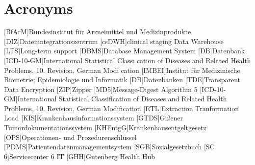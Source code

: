 \chapter*{Acronyms}
    \begin{acronym}[CDW]
    	[BfArM]{Bundesinstitut für Arzneimittel und Medizinprodukte}
    	[DIZ]{Datenintegrationszentrum}
    	[csDWH]{clinical staging Data Warehouse}
    	[LTS]{Long-term support}
    	[DBMS]{Database Management System}
    	[DB]{Datenbank}
    	[ICD-10-GM]{International Statistical Classication of Diseases and Related Health
    		Problems, 10. Revision, German Modication}
    	[IMBEI]{Institut für Medizinische Biometrie; Epidemiologie und Informatik}
    	[DB]{Datenbanken}
    	[TDE]{Transparent Data Encryption}
    	[ZIP]{Zipper}
    	[MD5]{Message-Digest Algorithm 5}
    	[ICD-10-GM]{International Statistical Classification of Diseases and Related Health Problems, 10. Revision, German Modification}
    	[ETL]{Extraction Tranformation Load}
    	[KIS]{Krankenhausinformationssystem}
    	[GTDS]{Gißener Tumordokumentationssystem}
    	[KHEntgG]{Krankenhausentgeltgesetz}
    	[OPS]{Operationen- und Prozedurenschlüssel}
    	[PDMS]{Patientendatenmanagementsystem}
    	[SGB]{Sozialgesetzbuch}
    	[SC 6]{Servicecenter 6 IT}
    	[GHH]{Gutenberg Health Hub}
    \end{acronym}
